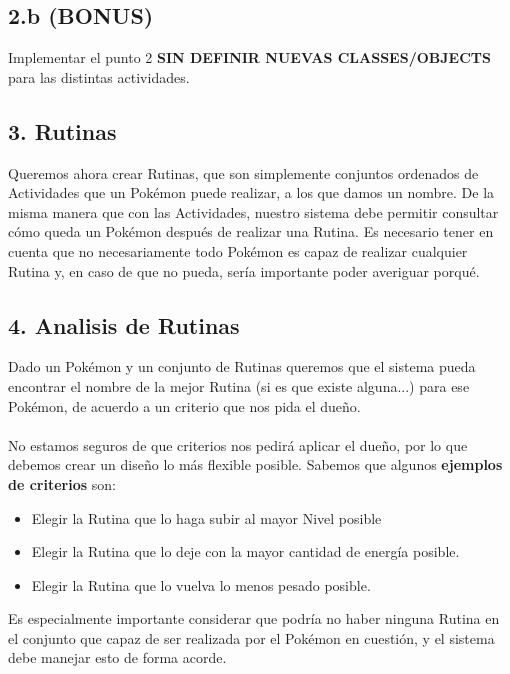 \documentclass[spanish,a4paper]{article}
\begin{document}
\subsection*{2.b (BONUS)}
Implementar el punto 2 \textbf{SIN DEFINIR NUEVAS CLASSES/OBJECTS} para las distintas actividades.

\subsection*{3. Rutinas}

Queremos ahora crear Rutinas, que son simplemente conjuntos ordenados de Actividades que un Pokémon puede realizar, a los que damos un nombre.
De la misma manera que con las Actividades, nuestro sistema debe permitir consultar  cómo queda un Pokémon después de realizar una Rutina.
Es necesario tener en cuenta que no necesariamente todo Pokémon es capaz de realizar cualquier Rutina y, en caso de que no pueda, sería importante poder averiguar porqué.

\subsection*{4. Analisis de Rutinas}

Dado un Pokémon y un conjunto de Rutinas queremos que el sistema pueda encontrar el nombre de la mejor Rutina (si es que existe alguna...) para ese Pokémon, de acuerdo a un criterio que nos pida el dueño.
\\\\
No estamos seguros de que criterios nos pedirá aplicar el dueño, por lo que debemos crear un diseño lo más flexible posible. 
Sabemos que algunos \textbf{ejemplos de criterios} son:

\begin{itemize}
 \item Elegir la Rutina que lo haga subir al mayor Nivel posible
 \item Elegir la Rutina que lo deje con la mayor cantidad de energía posible.
 \item Elegir la Rutina que lo vuelva lo menos pesado posible.
\end{itemize}

Es especialmente importante considerar que podría no haber ninguna Rutina en el conjunto que capaz de ser realizada por el Pokémon en cuestión, y el sistema debe manejar esto de forma acorde.
\end{document}
